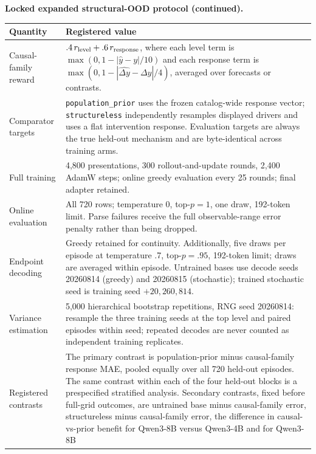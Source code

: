 \begin{center}
\begin{minipage}{\linewidth}
\centering
\scriptsize
\noindent\textbf{Locked expanded structural-OOD protocol (continued).}\par\smallskip
\setlength{\tabcolsep}{3pt}
\begin{tabular}{p{.29\linewidth}p{.66\linewidth}}
\toprule
\textbf{Quantity} & \textbf{Registered value} \\
\midrule
Causal-family reward & $.4\,r_{\rm level}+.6\,r_{\rm response}$, where each level
term is $\max(0,1-|\hat y-y|/10)$ and each response term is
$\max(0,1-|\widehat{\Delta y}-\Delta y|/4)$, averaged over forecasts or contrasts. \\
Comparator targets & \texttt{population\_prior} uses the frozen catalog-wide
response vector; \texttt{structureless} independently resamples displayed drivers
and uses a flat intervention response.  Evaluation targets are always the true
held-out mechanism and are byte-identical across training arms. \\
Full training & 4,800 presentations, 300 rollout-and-update rounds, 2,400 AdamW
steps; online greedy evaluation every 25 rounds; final adapter retained. \\
Online evaluation & All 720 rows; temperature 0, top-$p=1$, one draw, 192-token
limit.  Parse failures receive the full observable-range error penalty rather than
being dropped. \\
Endpoint decoding & Greedy retained for continuity.  Additionally, five draws per
episode at temperature .7, top-$p=.95$, 192-token limit; draws are averaged within
episode.  Untrained bases use decode seeds 20260814 (greedy) and 20260815
(stochastic); trained stochastic seed is training seed $+20{,}260{,}814$. \\
Variance estimation & 5,000 hierarchical bootstrap repetitions, RNG seed 20260814:
resample the three training seeds at the top level and paired episodes within seed;
repeated decodes are never counted as independent training replicates. \\
Registered contrasts & The primary contrast is population-prior minus causal-family
response MAE, pooled equally over all 720 held-out episodes.  The same contrast
within each of the four held-out blocks is a prespecified stratified analysis.
Secondary contrasts, fixed before full-grid outcomes, are untrained base minus
causal-family error, structureless minus causal-family error, the
difference in causal-vs-prior benefit for Qwen3-8B versus Qwen3-4B and for Qwen3-8B

\end{tabular}
\end{minipage}
\end{center}
